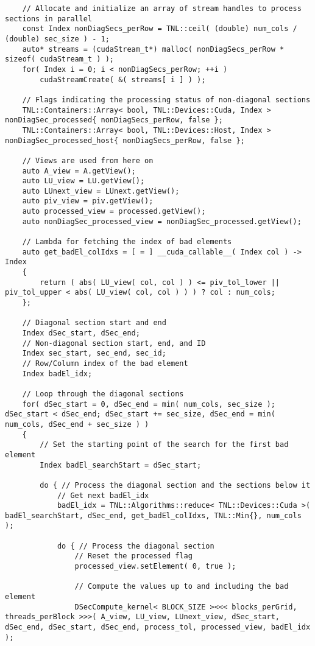 \begin{lstlisting}
	// Allocate and initialize an array of stream handles to process sections in parallel
	const Index nonDiagSecs_perRow = TNL::ceil( (double) num_cols / (double) sec_size ) - 1;
	auto* streams = (cudaStream_t*) malloc( nonDiagSecs_perRow * sizeof( cudaStream_t ) );
	for( Index i = 0; i < nonDiagSecs_perRow; ++i )
		cudaStreamCreate( &( streams[ i ] ) );
	
	// Flags indicating the processing status of non-diagonal sections
	TNL::Containers::Array< bool, TNL::Devices::Cuda, Index > nonDiagSec_processed{ nonDiagSecs_perRow, false };
	TNL::Containers::Array< bool, TNL::Devices::Host, Index > nonDiagSec_processed_host{ nonDiagSecs_perRow, false };
	
	// Views are used from here on
	auto A_view = A.getView();
	auto LU_view = LU.getView();
	auto LUnext_view = LUnext.getView();
	auto piv_view = piv.getView();
	auto processed_view = processed.getView();
	auto nonDiagSec_processed_view = nonDiagSec_processed.getView();
	
	// Lambda for fetching the index of bad elements
	auto get_badEl_colIdxs = [ = ] __cuda_callable__( Index col ) -> Index
	{
		return ( abs( LU_view( col, col ) ) <= piv_tol_lower || piv_tol_upper < abs( LU_view( col, col ) ) ) ? col : num_cols;
	};
	
	// Diagonal section start and end
	Index dSec_start, dSec_end;
	// Non-diagonal section start, end, and ID
	Index sec_start, sec_end, sec_id;
	// Row/Column index of the bad element
	Index badEl_idx;
	
	// Loop through the diagonal sections
	for( dSec_start = 0, dSec_end = min( num_cols, sec_size ); dSec_start < dSec_end; dSec_start += sec_size, dSec_end = min( num_cols, dSec_end + sec_size ) )
	{
		// Set the starting point of the search for the first bad element
		Index badEl_searchStart = dSec_start;
		
		do { // Process the diagonal section and the sections below it
			// Get next badEl_idx
			badEl_idx = TNL::Algorithms::reduce< TNL::Devices::Cuda >( badEl_searchStart, dSec_end, get_badEl_colIdxs, TNL::Min{}, num_cols );
			
			do { // Process the diagonal section
				// Reset the processed flag
				processed_view.setElement( 0, true );
				
				// Compute the values up to and including the bad element
				DSecCompute_kernel< BLOCK_SIZE ><<< blocks_perGrid, threads_perBlock >>>( A_view, LU_view, LUnext_view, dSec_start, dSec_end, dSec_start, dSec_end, process_tol, processed_view, badEl_idx );
				

\end{lstlisting}
